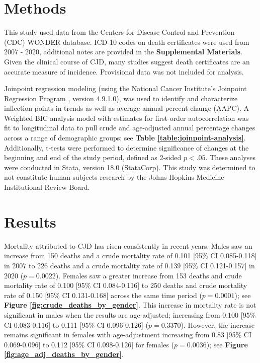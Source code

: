 \documentclass[12pt]{article}
\begin{document}
\section*{Methods}

\par \bigskip

\noindent This study used data from the Centers for Disease Control and Prevention (CDC) WONDER database\cite{CDCWonder}. ICD-10 codes on death certificates were used from 2007 - 2020, additional notes are provided in the \textbf{Supplemental Materials}. Given the clinical course of CJD, many studies suggest death certificates are an accurate measure of incidence\cite{NeuroEpi}. Provisional data was not included for analysis. 

\par \bigskip

\noindent Joinpoint regression modeling (using the National Cancer Institute’s Joinpoint Regression Program \cite{StatMed, Joinpoint}, version 4.9.1.0), was used to identify and characterize inflection points in trends as well as average annual percent change (AAPC). A Weighted BIC analysis model with estimates for first-order autocorrelation was fit to longitudinal data to pull crude and age-adjusted annual percentage changes across a range of demographic groups; see \textbf{Table \ref{table:joinpoint-analysis}}. Additionally, t-tests were performed to determine significance of changes at the beginning and end of the study period, defined as 2-sided $p < .05$. These analyses were conducted in Stata, version 18.0 (StataCorp). This study was determined to not constitute human subjects research by the Johns Hopkins Medicine Institutional Review Board.

\newpage

\section*{Results}

Mortality attributed to CJD has risen consistently in recent years. Males saw an increase from 150 deaths and a crude mortality rate of 0.101 [95\% CI 0.085-0.118] in 2007 to 226 deaths and a crude mortality rate of 0.139 [95\% CI 0.121-0.157] in 2020 ($p = 0.0022$). Females saw a greater increase from 153 deaths and crude mortality rate of 0.100 [95\% CI 0.084-0.116] to 250 deaths and crude mortality rate of 0.150 [95\% CI 0.131-0.168] across the same time period ($p = 0.0001$); see \textbf{Figure \ref{fig:crude_deaths_by_gender}}. This increase in mortality rate is not significant in males when the results are age-adjusted; increasing from 0.100 [95\% CI 0.083-0.116] to 0.111 [95\% CI 0.096-0.126] ($p = 0.3370$). However, the increase remains significant in females with age-adjustment increasing from 0.83 [95\% CI 0.069-0.096] to 0.112 [95\% CI 0.098-0.126] for females ($p = 0.0036$); see \textbf{Figure \ref{fig:age_adj_deaths_by_gender}}. 
\end{document}
